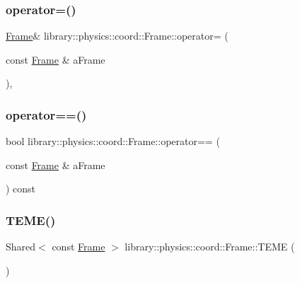 \subsubsection{\texorpdfstring{operator=()}{operator=()}}
{\footnotesize\ttfamily \hyperlink{classlibrary_1_1physics_1_1coord_1_1_frame}{Frame}\& library\+::physics\+::coord\+::\+Frame\+::operator= (\begin{DoxyParamCaption}\item[{const \hyperlink{classlibrary_1_1physics_1_1coord_1_1_frame}{Frame} \&}]{a\+Frame }\end{DoxyParamCaption})\hspace{0.3cm}{\ttfamily [protected]}, {\ttfamily [default]}}

\mbox{\label{classlibrary_1_1physics_1_1coord_1_1_frame_a19c5c4ce3b1669a774980d9c3f18fe6c}} 
\subsubsection{\texorpdfstring{operator==()}{operator==()}}
{\footnotesize\ttfamily bool library\+::physics\+::coord\+::\+Frame\+::operator== (\begin{DoxyParamCaption}\item[{const \hyperlink{classlibrary_1_1physics_1_1coord_1_1_frame}{Frame} \&}]{a\+Frame }\end{DoxyParamCaption}) const}

\mbox{\label{classlibrary_1_1physics_1_1coord_1_1_frame_a1c59f635fe7a36f416994c83533bfb40}} 
\subsubsection{\texorpdfstring{T\+E\+M\+E()}{TEME()}}
{\footnotesize\ttfamily Shared$<$ const \hyperlink{classlibrary_1_1physics_1_1coord_1_1_frame}{Frame} $>$ library\+::physics\+::coord\+::\+Frame\+::\+T\+E\+ME (\begin{DoxyParamCaption}{ }\end{DoxyParamCaption})\hspace{0.3cm}{\ttfamily [static]}}

